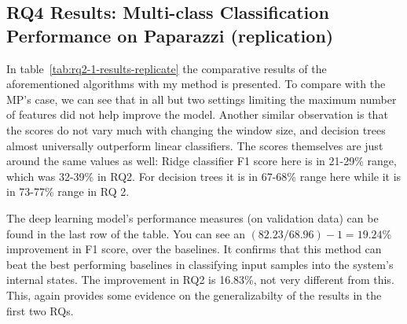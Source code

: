 \subsection{RQ4 Results: Multi-class Classification Performance on Paparazzi (replication)}
In table~\ref{tab:rq2-1-results-replicate} the comparative results of the aforementioned algorithms with my method is presented. 
To compare with the MP's case, we can see that in all but two settings limiting the maximum number of features did not help improve the model. 
Another similar observation is that the scores do not vary much with changing the window size, and decision trees almost universally outperform linear classifiers.
The scores themselves are just around the same values as well: Ridge classifier F1 score here is in 21-29\% range, which was 32-39\% in RQ2. For decision trees it is in 67-68\% range here while it is in 73-77\% range in RQ 2. 

The deep learning model's performance measures (on validation data) can be found in the last row of the table. 
You can see an $(82.23/68.96)-1=19.24\%$ improvement in F1 score, over the baselines. It confirms that this method can beat the best performing baselines in classifying input samples into the system's internal states. The improvement in RQ2 is 16.83\%, not very different from this. This, again provides some evidence on the generalizabilty of the results in the first two RQs.

